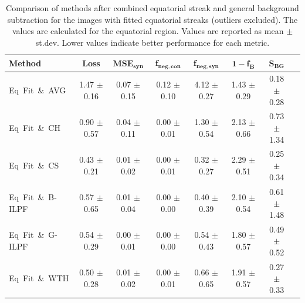 \documentclass[iucr]{iucrjournals}
\begin{document}
\begin{table}[t]%
\centering
\small
\setlength{\tabcolsep}{4pt}
\renewcommand{\arraystretch}{1.3}
\begin{tabular}{@{}lccccccc@{}}
\toprule
\textbf{Method} & \textbf{Loss} &
$\mathbf{MSE}_{\mathbf{syn}}$ &
$\mathbf{f}_{\mathbf{neg,con}}$ &
$\mathbf{f}_{\mathbf{neg,syn}}$ &
$\mathbf{1-f_B}$ &
$\mathbf{S}_{\mathbf{BG}}$ \\ \midrule

Eq~Fit~\&~AVG  & 1.47 $\pm$ 0.16 & 0.07 $\pm$ 0.15 & 0.12 $\pm$ 0.10 & 4.12 $\pm$ 0.27 & 1.43 $\pm$ 0.29 & 0.18 $\pm$ 0.28 \\
Eq~Fit~\&~CH  & 0.90 $\pm$ 0.57 & 0.04 $\pm$ 0.11 & 0.00 $\pm$ 0.01 & 1.30 $\pm$ 0.54 & 2.13 $\pm$ 0.66 & 0.73 $\pm$ 1.34 \\
Eq~Fit~\&~CS  & 0.43 $\pm$ 0.21 & 0.01 $\pm$ 0.02 & 0.00 $\pm$ 0.01 & 0.32 $\pm$ 0.27 & 2.29 $\pm$ 0.51 & 0.25 $\pm$ 0.34 \\
Eq~Fit~\&~B-ILPF  & 0.57 $\pm$ 0.65 & 0.01 $\pm$ 0.04 & 0.00 $\pm$ 0.00 & 0.40 $\pm$ 0.39 & 2.10 $\pm$ 0.54 & 0.61 $\pm$ 1.48 \\
Eq~Fit~\&~G-ILPF  & 0.54 $\pm$ 0.29 & 0.00 $\pm$ 0.01 & 0.00 $\pm$ 0.00 & 0.54 $\pm$ 0.43 & 1.80 $\pm$ 0.57 & 0.49 $\pm$ 0.52 \\
Eq~Fit~\&~WTH & 0.50 $\pm$ 0.28 & 0.01 $\pm$ 0.02 & 0.00 $\pm$ 0.01 & 0.66 $\pm$ 0.65 & 1.91 $\pm$ 0.57 & 0.27 $\pm$ 0.33 \\

\bottomrule
\end{tabular}


\caption{Comparison of methods after combined equatorial streak and general background subtraction for the images with fitted equatorial streaks (outliers excluded). The values are calculated for the equatorial region. Values are reported as mean $\pm$ st.dev. Lower values indicate better performance for each metric.}
\label{tab:combined_eq_general}
\end{table}
\end{document}

